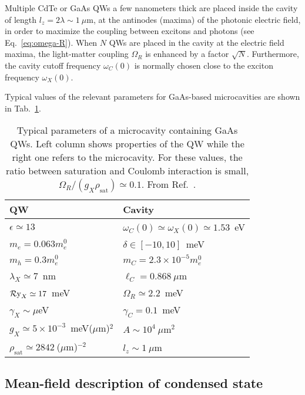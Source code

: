Multiple CdTe or GaAs QWs a few nanometers thick are placed inside the
cavity of length $l_z = 2\lambda \sim 1~\mu$m, at the antinodes
(maxima) of the photonic electric field, in order to maximize the
coupling between excitons and photons (see
Eq.~\eqref{eq:omega-R}). When $N$ QWs are placed in the cavity at the
electric field maxima, the light-matter coupling $\Omega_R$ is
enhanced by a factor $\sqrt{N}$. Furthermore, the cavity cutoff
frequency $\omega_C(0)$ is normally chosen close to the exciton
frequency $\omega_X(0)$.

Typical values of the relevant parameters for GaAs-based
microcavities are shown in Tab.~\ref{tab:GaAs-params}. 
%
\begin{table}
  \centering
  \begin{tabular}{@{}ll@{}} \toprule
    QW & Cavity \\ \midrule
    $\epsilon \simeq 13$ &  $\omega_C(0) \simeq \omega_X(0) \simeq 1.53$~eV\\
    $m_e = 0.063m^0_e$    &  $\delta \in [-10,10]$~meV\\
    $m_h = 0.3m^0_e$      &  $m_{C} = 2.3\times 10^{-5} m^0_e$ \\
    $\lambda_X \simeq 7$~nm   & $\ell_{C} = 0.868~\mu$m\\
    $\operatorname{\mathcal{R}y}_X \simeq 17$~meV &  $\Omega_R \simeq 2.2$~meV \\
    $\gamma_X \sim \mu$eV &  $\gamma_C = 0.1$~meV \\ 
    $g_X \simeq 5\times10^{-3}$~meV($\mu$m)$^2$ &  $A \sim 10^4~\mu$m$^2$\\
    $\rho_{\text{sat}} \simeq 2842~$($\mu$m)$^{-2}$ &  $l_z \sim 1~\mu$m\\ \bottomrule
  \end{tabular}
  \caption{Typical parameters of a microcavity containing GaAs QWs. Left column shows properties of the QW while the right one refers to the microcavity. For these values, the ratio between saturation and
    Coulomb interaction is small,
    $\Omega_R/(g_X \rho_{\text{sat}}) \simeq 0.1$. From Ref.~\cite{9783642241857}.}
  \label{tab:GaAs-params}
\end{table}
%


\subsection{Mean-field description of condensed state}
\label{subsec:mean-field}

